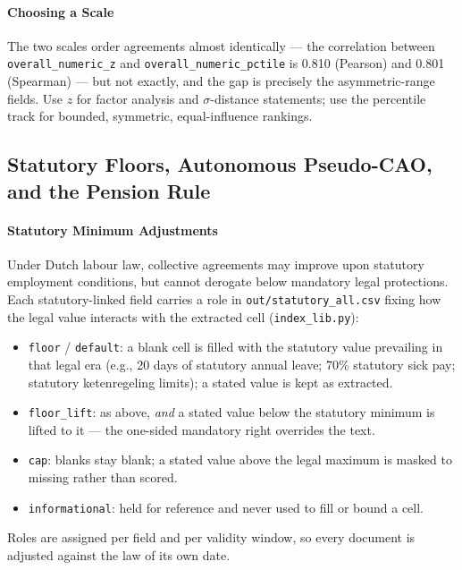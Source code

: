 \paragraph{Choosing a Scale}
The two scales order agreements almost identically --- the correlation between \nolinkurl{overall_numeric_z} and \nolinkurl{overall_numeric_pctile} is 0.810 (Pearson) and 0.801 (Spearman) --- but not exactly, and the gap is precisely the asymmetric-range fields. Use $z$ for factor analysis and $\sigma$-distance statements; use the percentile track for bounded, symmetric, equal-influence rankings.

\subsection{Statutory Floors, Autonomous Pseudo-CAO, and the Pension Rule}
\label{sec:statutory_floors}

\paragraph{Statutory Minimum Adjustments}
Under Dutch labour law, collective agreements may improve upon statutory employment conditions, but cannot derogate below mandatory legal protections. Each statutory-linked field carries a role in \nolinkurl{out/statutory_all.csv} fixing how the legal value interacts with the extracted cell (\nolinkurl{index_lib.py}):
\begin{itemize}[leftmargin=1.5em]
  \item \nolinkurl{floor} / \nolinkurl{default}: a blank cell is filled with the statutory value prevailing in that legal era (e.g., 20 days of statutory annual leave; 70\% statutory sick pay; statutory ketenregeling limits); a stated value is kept as extracted.
  \item \nolinkurl{floor_lift}: as above, \emph{and} a stated value below the statutory minimum is lifted to it --- the one-sided mandatory right overrides the text.
  \item \nolinkurl{cap}: blanks stay blank; a stated value above the legal maximum is masked to missing rather than scored.
  \item \nolinkurl{informational}: held for reference and never used to fill or bound a cell.
\end{itemize}
Roles are assigned per field and per validity window, so every document is adjusted against the law of its own date.

